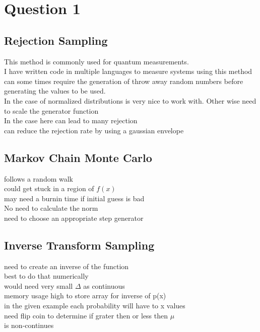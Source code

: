 \documentclass{article}
\begin{document}
\section{Question 1}

\subsection{Rejection Sampling}

This method is commonly used for quantum measurements.\citep{Rivas2011} \\
I have written code in multiple languages to measure systems using this method \\
can some times require the generation of throw away random numbers before generating the values to be used. \\
In the case of normalized distributions is very nice to work with. Other wise need to scale the generator function \citep{JakeRS}\\
In the case here can lead to many rejection \\
can reduce the rejection rate by using a gaussian envelope \citep{RelSRS}\\





\subsection{Markov Chain Monte Carlo}


follows a random walk\citep{robert2016metropolishastingsalgorithm} \\
could get stuck in a region of $f(x)$ \\
may need a burnin time if initial guess is bad\citep{DMHA}\\
No need to calculate the norm\\ 
need to choose an appropriate step generator \\


\subsection{Inverse Transform Sampling}

need to create an inverse of the function \\
best to do that numerically \\
would need very small $\Delta$ as continuous\\
memory usage high to store array for inverse of p(x)\\
in the given example each probability will have to x values\\
need flip coin to determine if grater then or less then $\mu$\\
is non-continues \citep{ITPCDF}\citep{KKCDF}
\end{document}
